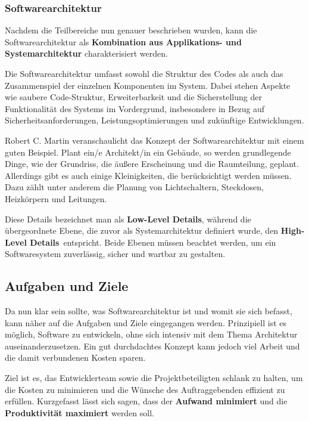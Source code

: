     \subsubsection{Softwarearchitektur}

    Nachdem die Teilbereiche nun genauer beschrieben wurden, kann die Softwarearchitektur als \textbf{Kombination aus Applikations- und Systemarchitektur} charakterisiert werden.

    Die Softwarearchitektur umfasst sowohl die Struktur des Codes als auch das Zusammenspiel der einzelnen Komponenten im System.
    Dabei stehen Aspekte wie saubere Code-Struktur, Erweiterbarkeit und die Sicherstellung der Funktionalität des Systems im Vordergrund, insbesondere in Bezug auf Sicherheitsanforderungen, Leistungsoptimierungen und zukünftige Entwicklungen.
    \cite{EA:Web01}

    Robert C. Martin veranschaulicht das Konzept der Softwarearchitektur mit einem guten Beispiel. Plant ein/e Architekt/in ein Gebäude, so werden grundlegende Dinge, wie der Grundriss, die äußere Erscheinung und die Raumteilung, geplant. Allerdings gibt es auch einige Kleinigkeiten, die berücksichtigt werden müssen. Dazu zählt unter anderem die Planung von Lichtschaltern, Steckdosen, Heizkörpern und Leitungen.
    \cite[S. 4]{EA:Book01}

    Diese Details bezeichnet man als \textbf{\glqq Low-Level Details\grqq}, während die übergeordnete Ebene, die zuvor als Systemarchitektur definiert wurde, den \textbf{\glqq High-Level Details\grqq}\ entspricht. Beide Ebenen müssen beachtet werden, um ein Softwaresystem zuverlässig, sicher und wartbar zu gestalten.



\subsection{Aufgaben und Ziele} \label{Aufgaben und Ziele}

Da nun klar sein sollte, was Softwarearchitektur ist und womit sie sich befasst, kann näher auf die Aufgaben und Ziele eingegangen werden. 
Prinzipiell ist es möglich, Software zu entwickeln, ohne sich intensiv mit dem Thema Architektur auseinanderzusetzen.
Ein gut durchdachtes Konzept kann jedoch viel Arbeit und die damit verbundenen Kosten sparen.

Ziel ist es, das Entwicklerteam sowie die Projektbeteiligten schlank zu halten, um die Kosten zu minimieren und die Wünsche des Auftraggebenden effizient zu erfüllen. Kurzgefasst lässt sich sagen, dass der \textbf{Aufwand minimiert} und die \textbf{Produktivität maximiert} werden soll. 
\cite[S. 4-5]{EA:Book01}

